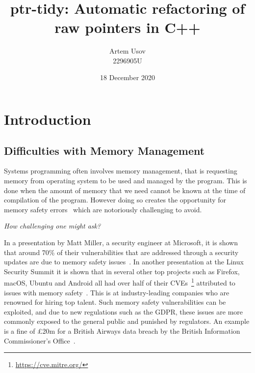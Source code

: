 \documentclass{proposal}
\begin{document}




    \title{ptr-tidy: Automatic refactoring of raw pointers in C++}
    \author{Artem Usov\\ 2296905U}
    \date{18 December 2020}
    \maketitle
    \tableofcontents
    \newpage




    \section{Introduction}\label{sec:intro}

    \subsection{Difficulties with Memory Management}\label{subsec:difficulties-with-memory-management}

    Systems programming often involves memory management, that is requesting memory from operating system to be used and managed by the program.
    This is done when the amount of memory that we need cannot be known at the time of compilation of the program.
    However doing so creates the opportunity for memory safety errors~\cite{Dhurjati2003} which are notoriously challenging to avoid.

    \emph{How challenging one might ask?}

    In a presentation by Matt Miller, a security engineer at Microsoft, it is shown that around 70\% of their vulnerabilities that are addressed through a security updates are due to memory safety issues~\cite{Miller2019}.
    In another presentation at the Linux Security Summit it is shown that in several other top projects such as Firefox, macOS, Ubuntu and Android all had over half of their CVEs~\footnote{\url{https://cve.mitre.org/}} attributed to issues with memory safety~\cite{Gaynor2020}.
    This is at industry-leading companies who are renowned for hiring top talent.
    Such memory safety vulnerabilities can be exploited, and due to new regulations such as the GDPR, these issues are more commonly exposed to the general public and punished by regulators.
    An example is a fine of £20m for a British Airways data breach by the British Information Commissioner's Office~\cite{ICO2020}.
\end{document}
